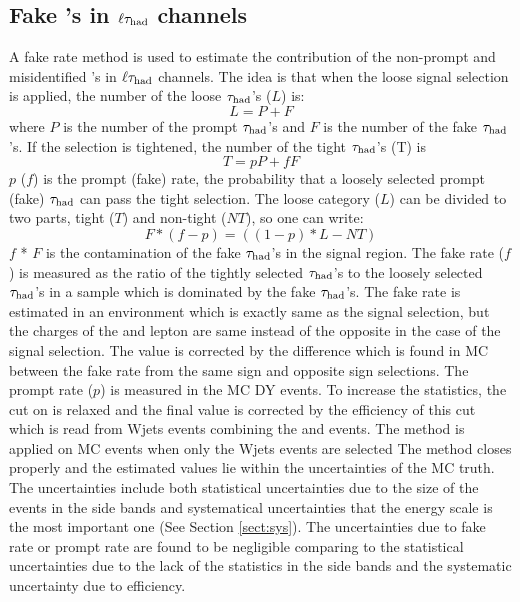 \subsection{\texorpdfstring{Fake \Tau's in $\ell\tau_{\rm had}$ channels}{Fake taus in lepton-tau channels}}
A fake rate method is used to estimate the contribution of the non-prompt and misidentified \Tau's in $\ell\tau_{\rm had}$ channels. 
The idea is that when the loose signal selection is applied, the number of the loose $\tau_{\rm had}$'s ($L$) is:
\begin{equation}
L = P + F
\end{equation}
where $P$ is the number of the  prompt $\tau_{\rm had}$'s and $F$ is the number of the  fake $\tau_{\rm had}$'s. If the selection is tightened, the number of the tight $\tau_{\rm had}$'s (T) is
\begin{equation}
 T = pP + fF
\end{equation} 
$p$ ($f$) is the prompt (fake) rate, the probability that a loosely selected prompt (fake) $\tau_{\rm had}$ can pass the  tight  selection. The loose category ($L$) can be divided to two parts, 
tight ($T$) and non-tight ($NT$), so one can write:
\begin{equation}
   F * (f - p) = ((1 - p) * L - NT)
\end{equation}
$f$ * $F$ is the contamination of the fake $\tau_{\rm had}$'s in the signal region. 
The fake rate ($f$) is measured as the ratio of the tightly selected $\tau_{\rm had}$'s to the loosely 
selected $\tau_{\rm had}$'s in a sample which is dominated by the fake $\tau_{\rm had}$'s. The fake rate is estimated in an environment which is exactly 
same as the signal selection, but the charges of the \Tau and lepton are same instead of the opposite in the case of the signal selection. 
The value is corrected by the difference which is found in MC between the fake rate from the same sign and opposite sign selections.
The prompt rate ($p$) is measured in the MC DY events. 
To increase the statistics, the cut on \tauMT is relaxed and the final value is corrected by the efficiency of this 
cut which is read from Wjets events combining the \eTau and \muTau events.
The method is applied on MC events when only the Wjets events are selected 
The method closes properly and the estimated values lie within the uncertainties of the MC truth. 
The uncertainties include both statistical uncertainties due to the size of the events in the side bands 
and systematical uncertainties that the \Tau energy scale is the most important one (See Section \ref{sect:sys}). 
The uncertainties due to %
fake rate or prompt rate %
are found to be negligible comparing to the statistical uncertainties due to the lack of the  statistics in the side bands  
and the systematic uncertainty due to \tauMT efficiency.


